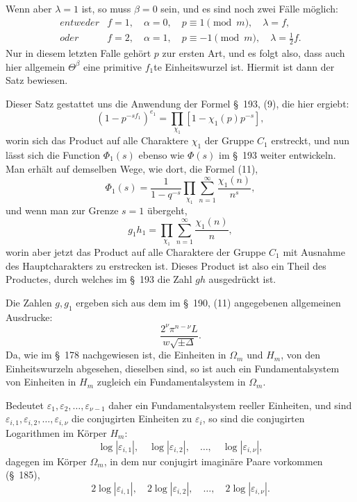 \documentclass[11pt]{article}
\providecommand{\eps}{\varepsilon}
\providecommand{\eps}{\varepsilon}
\begin{document}
Wenn aber $\lambda=1$ ist, so muss $\beta=0$ sein, und es sind noch zwei Fälle möglich:
\[
\begin{array}{ll}
entweder & f=1,\quad \alpha=0,\quad p\equiv1\pmod m,\quad \lambda=f,\\[2mm]
oder & f=2,\quad \alpha=1,\quad p\equiv-1\pmod m,\quad \lambda=\frac12f.
\end{array}
\]
Nur in diesem letzten Falle gehört $p$ zur ersten Art, und es folgt also, dass auch hier allgemein $\Theta^\beta$ eine primitive $f_1$te Einheitswurzel ist. Hiermit ist dann der Satz bewiesen.

Dieser Satz gestattet uns die Anwendung der Formel \S~193, (9), die hier ergiebt:
\begin{equation}
(1-p^{-sf_1})^{e_1}=\prod_{\chi_1}[1-\chi_1(p)p^{-s}],
\tag{8}
\end{equation}
worin sich das Product auf alle Charaktere $\chi_1$ der Gruppe $C_1$ erstreckt, und nun lässt sich die Function $\Phi_1(s)$ ebenso wie $\Phi(s)$ im \S~193 weiter entwickeln. Man erhält auf demselben Wege, wie dort, die Formel (11),
\begin{equation}
\Phi_1(s)=\frac1{1-q^{-s}}\prod_{\chi_1}\sum_{n=1}^{\infty}\frac{\chi_1(n)}{n^s},
\tag{9}
\end{equation}
und wenn man zur Grenze $s=1$ übergeht,
\begin{equation}
g_1h_1=\prod_{\chi_1}\sum_{n=1}^{\infty}\frac{\chi_1(n)}{n},
\tag{10}
\end{equation}
worin aber jetzt das Product auf alle Charaktere der Gruppe $C_1$ mit Ausnahme des Hauptcharakters zu erstrecken ist. Dieses Product ist also ein Theil des Productes, durch welches im \S~193 die Zahl $gh$ ausgedrückt ist.

Die Zahlen $g,g_1$ ergeben sich aus dem im \S~190, (11) angegebenen allgemeinen Ausdrucke:
\begin{equation}
\frac{2^\nu\pi^{n-\nu}L}{w\sqrt{\pm\Delta}}.
\tag{11}
\end{equation}
Da, wie im \S~178 nachgewiesen ist, die Einheiten in $\Omega_m$ und $H_m$, von den Einheitswurzeln abgesehen, dieselben sind, so ist auch ein Fundamentalsystem von Einheiten in $H_m$ zugleich ein Fundamentalsystem in $\Omega_m$.

Bedeutet $\eps_1,\eps_2,\ldots,\eps_{\nu-1}$ daher ein Fundamentalsystem reeller Einheiten, und sind $\eps_{i,1},\eps_{i,2},\ldots,\eps_{i,\nu}$ die conjugirten Einheiten zu $\eps_i$, so sind die conjugirten Logarithmen im Körper $H_m$:
\[
\log|\eps_{i,1}|,\quad\log|\eps_{i,2}|,\quad\ldots,\quad\log|\eps_{i,\nu}|,
\]
dagegen im Körper $\Omega_m$, in dem nur conjugirt imaginäre Paare vorkommen (\S~185),
\[
2\log|\eps_{i,1}|,\quad2\log|\eps_{i,2}|,\quad\ldots,\quad2\log|\eps_{i,\nu}|.
\]
\end{document}
